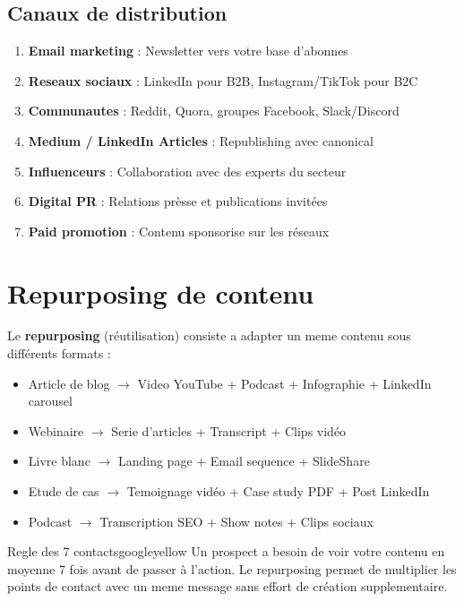 \documentclass[12pt,a4paper,twoside]{report}
\newcommand{\keyword}[1]{\textbf{\textcolor{googleblue}{#1}}}
\begin{document}
\subsection{Canaux de distribution}

\begin{enumerate}
    \item \textbf{Email marketing} : Newsletter vers votre base d'abonnes
    \item \textbf{Reseaux sociaux} : LinkedIn pour B2B, Instagram/TikTok pour B2C
    \item \textbf{Communautes} : Reddit, Quora, groupes Facebook, Slack/Discord
    \item \textbf{Medium / LinkedIn Articles} : Republishing avec canonical
    \item \textbf{Influenceurs} : Collaboration avec des experts du secteur
    \item \textbf{Digital PR} : Relations prèsse et publications invitées
    \item \textbf{Paid promotion} : Contenu sponsorise sur les réseaux
\end{enumerate}

\section{Repurposing de contenu}

Le \keyword{repurposing} (réutilisation) consiste a adapter un meme contenu sous différents formats :

\begin{itemize}
    \item Article de blog $\rightarrow$ Video YouTube + Podcast + Infographie + LinkedIn carousel
    \item Webinaire $\rightarrow$ Serie d'articles + Transcript + Clips vidéo
    \item Livre blanc $\rightarrow$ Landing page + Email sequence + SlideShare
    \item Etude de cas $\rightarrow$ Temoignage vidéo + Case study PDF + Post LinkedIn
    \item Podcast $\rightarrow$ Transcription SEO + Show notes + Clips sociaux
\end{itemize}

\begin{mybox}{Regle des 7 contacts}{googleyellow}
Un prospect a besoin de voir votre contenu en moyenne 7 fois avant de passer à l'action. Le repurposing permet de multiplier les points de contact avec un meme message sans effort de création supplementaire.
\end{mybox}
\end{document}
